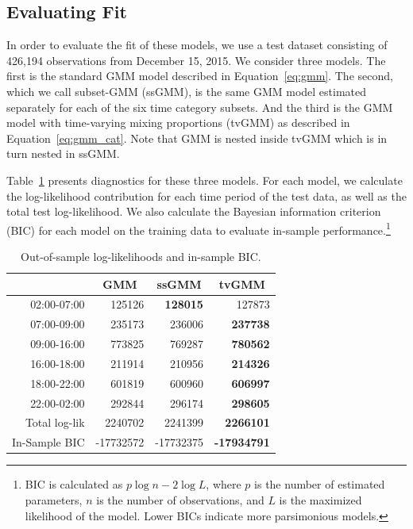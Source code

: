 \documentclass[12pt]{article}
\theoremstyle{definition}
\theoremstyle{algodesc}
\begin{document}
\subsection{Evaluating Fit}
In order to evaluate the fit of these models, we use a test dataset consisting of 426,194 observations from December 15, 2015. We consider three models. The first is the standard GMM model described in Equation~\ref{eq:gmm}. The second, which we call subset-GMM (ssGMM), is the same GMM model estimated separately for each of the six time category subsets. And the third is the GMM model with time-varying mixing proportions (tvGMM) as described in Equation~\ref{eq:gmm_cat}. Note that GMM is nested inside tvGMM which is in turn nested in ssGMM.

Table~\ref{tab:logliks} presents diagnostics for these three models. For each model, we calculate the log-likelihood contribution for each time period of the test data, as well as the total test log-likelihood. We also calculate the Bayesian information criterion (BIC) for each model on the training data to evaluate in-sample performance.\footnote{BIC is calculated as $p \log n - 2 \log L$, where $p$ is the number of estimated parameters, $n$ is the number of observations, and $L$ is the maximized likelihood of the model. Lower BICs indicate more parsimonious models.}

\begin{table}[htb] \centering
\begin{tabular}{rrrr}
  \toprule
   & \multicolumn{1}{c}{GMM} & \multicolumn{1}{c}{ssGMM} & \multicolumn{1}{c}{tvGMM} \\
  \midrule
  02:00-07:00 &  125126 &  \textbf{128015} &  127873 \\
  07:00-09:00 &  235173 &  236006 &  \textbf{237738} \\
  09:00-16:00 &  773825 &  769287 &  \textbf{780562} \\
  16:00-18:00 &  211914 &  210956 &  \textbf{214326} \\
  18:00-22:00 &  601819 &  600960 &  \textbf{606997} \\
  22:00-02:00 &  292844 &  296174 &  \textbf{298605} \\
  \midrule
  Total log-lik &  2240702 &  2241399 &  \textbf{2266101} \\
  In-Sample BIC & -17732572 & -17732375 & \textbf{-17934791} \\
  \bottomrule
\end{tabular}
\caption{Out-of-sample log-likelihoods and in-sample BIC.}
\label{tab:logliks}
\end{table}
\end{document}
